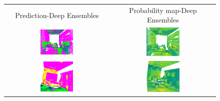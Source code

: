     \begin{figure}[h!]
        \centering
        \begin{tabular}{cc}
            Prediction-Deep Ensembles & Probability map-Deep Ensembles \\
            \includegraphics[width=0.33\textwidth, height=0.18\textheight]{images/seg_output/s3dis_DE/S3DIS_1_Pred.png}& 
            \includegraphics[width=0.33\textwidth, height=0.18\textheight]{images/seg_output/s3dis_DE/S3DIS_1_prob.png}\\

            \includegraphics[width=0.33\textwidth, height=0.18\textheight]{images/seg_output/s3dis_DE/S3DIS_2_Pred.png}& 
            \includegraphics[width=0.33\textwidth, height=0.18\textheight]{images/seg_output/s3dis_DE/S3DIS_2_prob.png}\\


\end{tabular}
\end{figure}
